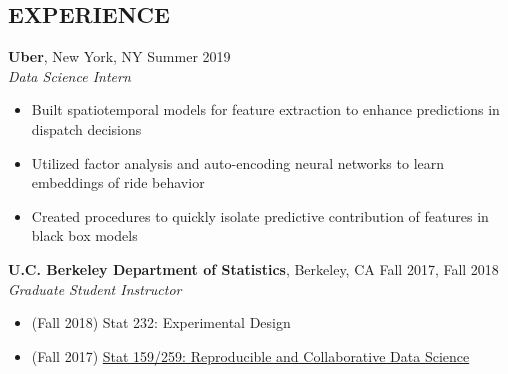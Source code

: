 \documentclass{res}
\begin{document}
\begin{resume}
\section{EXPERIENCE}
\textbf{Uber}, New York, NY \hfill{Summer 2019}\\
\textit{Data Science Intern}
\begin{itemize}
\item Built spatiotemporal models for feature extraction to enhance predictions in dispatch decisions
\item Utilized factor analysis and auto-encoding neural networks to learn embeddings of ride behavior
\item Created procedures to quickly isolate predictive contribution of features in black box  models
\end{itemize}
\textbf{U.C. Berkeley Department of Statistics}, Berkeley, CA  \hfill{Fall 2017, Fall 2018}\\
\textit{Graduate Student Instructor}
\begin{itemize}
\item (Fall 2018) Stat 232: Experimental Design
\item (Fall 2017) \href{https://berkeley-stat159-f17.github.io/stat159-f17/}{Stat 159/259: Reproducible and Collaborative Data Science}
\end{itemize}  
\vspace{-2mm}  

\end{resume}
\end{document}
